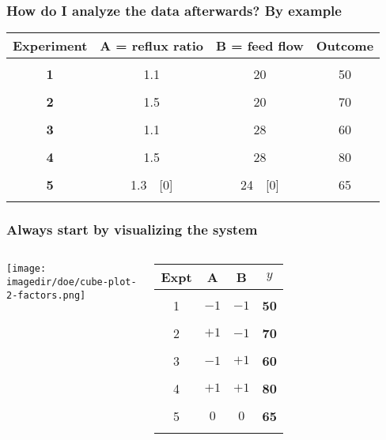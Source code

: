 \begin{frame}\frametitle{How do I analyze the data afterwards? By example}
	\begin{tabulary}{\linewidth}{c|c|c|c}
		\textbf{\relax Experiment} & \textbf{\relax A = reflux ratio} & \textbf{\relax B = feed flow} & \textbf{\relax Outcome} \\ \hline &  &  & \\
		\textbf{1} & 1.1 \qquad {\color{blue}[$-1$]} & 20 \qquad {\color{blue}[$-1$]}& {\color{myOrange}50}  \\ &  &  & \\
		\textbf{2} & 1.5 \qquad {\color{blue}[$+1$]} & 20 \qquad {\color{blue}[$-1$]}& {\color{myOrange}70}  \\ &  &  & \\
		\textbf{3} & 1.1 \qquad {\color{blue}[$-1$]} & 28 \qquad {\color{blue}[$+1$]}& {\color{myOrange}60}  \\ &  &  & \\
		\textbf{4} & 1.5 \qquad {\color{blue}[$+1$]} & 28 \qquad {\color{blue}[$+1$]}& {\color{myOrange}80}  \\ &  &  & \\
		\textbf{5} & 1.3 \qquad\,\, {\color{blue}[$0$]} & 24 \qquad\,\, {\color{blue}[$0$]}& {\color{myOrange}65}  \\ &  &  & \\
	\end{tabulary}
\end{frame}

\begin{frame}\frametitle{Always start by visualizing the system}
	\begin{columns}[T]
			\centerline{\texttt{[image: \\imagedir/doe/cube-plot-2-factors.png]}}
			\begin{tabulary}{\linewidth}{c|c|c|c}
				Expt & \textbf{\relax A} & \textbf{\relax B} & \textbf{\relax $y$} \\ \hline &  &  & \\
				1 &{\color{blue}$-1$} & {\color{blue}$-1$}& {\color{myOrange}\textbf{50}}  \\ &  &  & \\
				2 &{\color{blue}$+1$} & {\color{blue}$-1$}& {\color{myOrange}\textbf{70}}  \\ &  &  & \\
				3 &{\color{blue}$-1$} & {\color{blue}$+1$}& {\color{myOrange}\textbf{60}}  \\ &  &  & \\
				4 &{\color{blue}$+1$} & {\color{blue}$+1$}& {\color{myOrange}\textbf{80}}  \\ &  &  & \\
				5 &{\color{blue}$0$ } & {\color{blue}$0$ }& {\color{myOrange}\textbf{65}}  \\ &  &  & \\
			\end{tabulary}
	\end{columns}
\end{frame}

